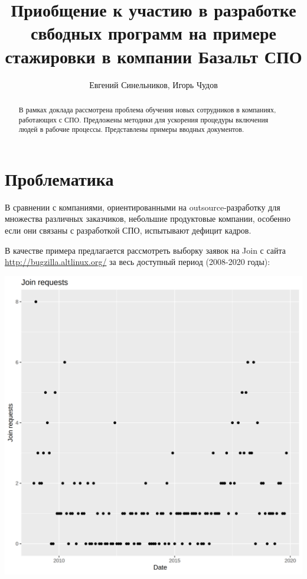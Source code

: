\author{Евгений Синельников, Игорь Чудов}
\title{Приобщение к участию в разработке свбодных программ на примере
стажировки в компании Базальт СПО}
\maketitle

\begin{abstract}
  В рамках доклада рассмотрена проблема обучения новых
  сотрудников в компаниях, работающих с СПО. Предложены методики для
  ускорения процедуры включения людей в рабочие процессы. Представлены
  примеры вводных документов.
\end{abstract}


\section{Проблематика}

В сравнении с компаниями, ориентированными на outsource-разработку для
множества различных заказчиков, небольшие продуктовые компании, особенно
если они связаны с разработкой СПО, испытывают дефицит кадров.

В качестве примера предлагается рассмотреть выборку заявок на Join
с сайта \url{http://bugzilla.altlinux.org/} за весь доступный период
(2008-2020 годы):

\includegraphics[width=\textwidth,height=\textheight,keepaspectratio]{ggplot}

